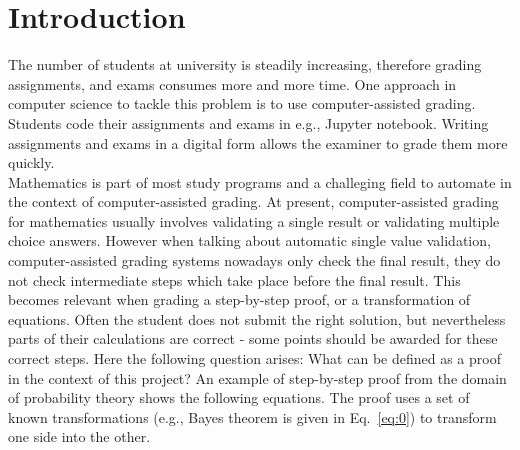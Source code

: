 

\chapter{Introduction}
    The number of students at university is steadily increasing, therefore grading assignments, and exams consumes more and more time.
    One approach in computer science to tackle this problem is to use computer-assisted grading. Students code their assignments and exams in e.g., Jupyter notebook.
    Writing assignments and exams in a digital form allows the examiner to grade them more quickly.\\ Mathematics is part of most study programs and a challeging field to automate
    in the context of computer-assisted grading. At present, computer-assisted grading for mathematics usually involves validating a single result or validating multiple choice answers.
    However when talking about automatic single value validation, computer-assisted grading systems nowadays only check
    the final result, they do not check intermediate steps which take place before the final result. This becomes relevant when grading
    a step-by-step proof, or a transformation of equations. Often the student does not submit the right solution, but nevertheless parts of their calculations are correct
    - some points should be awarded for these correct steps. \newpage Here the following question arises: What can be defined as a proof in the context of this project? An example of step-by-step
    proof from the domain of probability theory shows the following equations. The proof uses a set of known transformations (e.g., Bayes theorem is given in Eq.~\eqref{eq:0}) to transform one side into the other.
    
